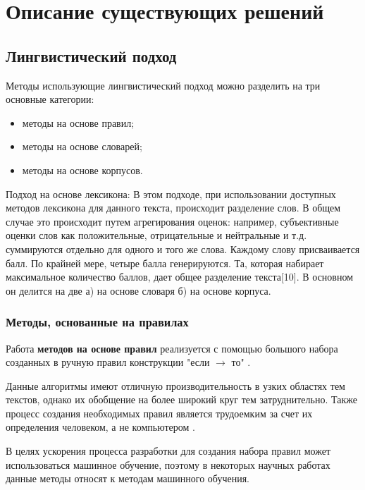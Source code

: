 \chapter{Описание существующих решений}

\section{Лингвистический подход}

Методы использующие лингвистический подход можно разделить на три основные
категории:
\begin{itemize}
    \item методы на основе правил;
    \item методы на основе словарей;
    \item методы на основе корпусов.
\end{itemize}

Подход на основе лексикона: В этом подходе, при использовании доступных методов
лексикона для данного текста, происходит разделение слов. В общем случае это
происходит путем агрегирования оценок: например, субъективные оценки слов как
положительные, отрицательные и нейтральные и т.д. суммируются отдельно для
одного и того же слова. Каждому слову присваивается балл. По крайней мере,
четыре балла генерируются. Та, которая набирает максимальное количество баллов,
дает общее разделение текста[10]. В основном он делится на две а) на основе
словаря б) на основе корпуса. \cite{article18}

\subsection{Методы, основанные на правилах}

Работа \textbf{методов на основе правил} реализуется с помощью большого набора
созданных в ручную правил конструкции "если $\rightarrow$ то" \cite{article14}.

Данные алгоритмы имеют отличную производительность в узких
областях тем текстов, однако их обобщение на более широкий круг тем
затруднительно. Также процесс создания необходимых правил является
трудоемким за счет их определения человеком, а не компьютером \cite{article15}.

В целях ускорения процесса разработки для создания набора правил может
использоваться машинное обучение, поэтому в некоторых научных работах
\cite{article16} \cite{article17} данные методы относят к методам машинного
обучения.


